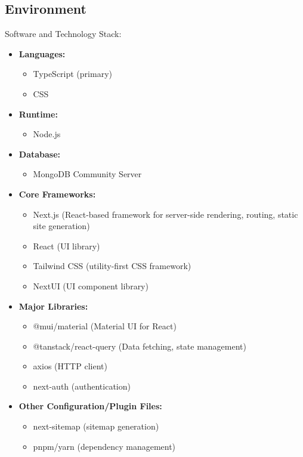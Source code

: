 \documentclass{article}
\begin{document}
\subsection{Environment}

Software and Technology Stack:
\begin{itemize}
  \item \textbf{Languages:}
    \begin{itemize}
      \item TypeScript (primary)
      \item CSS
    \end{itemize}
  \item \textbf{Runtime:}
    \begin{itemize}
      \item Node.js
    \end{itemize}
  \item \textbf{Database:}
    \begin{itemize}
      \item MongoDB Community Server
    \end{itemize}
  \item \textbf{Core Frameworks:}
    \begin{itemize}
      \item Next.js (React-based framework for server-side rendering, routing, static site generation)
      \item React (UI library)
      \item Tailwind CSS (utility-first CSS framework)
      \item NextUI (UI component library)
    \end{itemize}
  \item \textbf{Major Libraries:}
    \begin{itemize}
      \item @mui/material (Material UI for React)
      \item @tanstack/react-query (Data fetching, state management)
      \item axios (HTTP client)
      \item next-auth (authentication)
    \end{itemize}
  \item \textbf{Other Configuration/Plugin Files:}
    \begin{itemize}
      \item next-sitemap (sitemap generation)
      \item pnpm/yarn (dependency management)
    \end{itemize}
\end{itemize}
\end{document}
